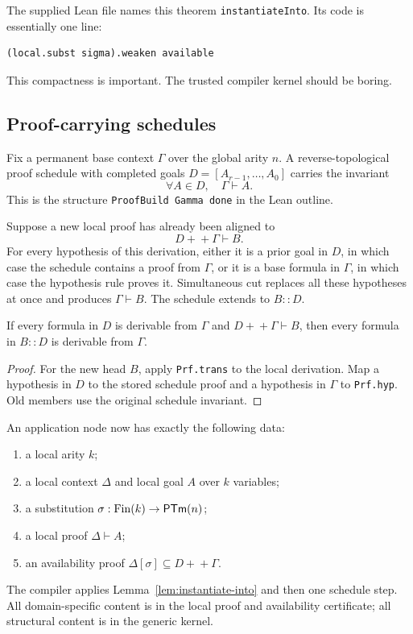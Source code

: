 The supplied Lean file names this theorem \texttt{instantiateInto}.  Its code is essentially one line:
\begin{lstlisting}[language={}]
(local.subst sigma).weaken available
\end{lstlisting}
This compactness is important.  The trusted compiler kernel should be boring.

\subsection{Proof-carrying schedules}

Fix a permanent base context \(\Gamma\) over the global arity \(n\).  A reverse-topological proof schedule
with completed goals \(D=[A_{r-1},\ldots,A_0]\) carries the invariant
\[
  \forall A\in D,\quad \Gamma\vdash A.
\]
This is the structure \texttt{ProofBuild Gamma done} in the Lean outline.

Suppose a new local proof has already been aligned to
\[
  D+\!+\Gamma\vdash B.
\]
For every hypothesis of this derivation, either it is a prior goal in \(D\), in which case the schedule
contains a proof from \(\Gamma\), or it is a base formula in \(\Gamma\), in which case the hypothesis rule
proves it.  Simultaneous cut replaces all these hypotheses at once and produces \(\Gamma\vdash B\).
The schedule extends to \(B::D\).

\begin{lemma}
If every formula in \(D\) is derivable from \(\Gamma\) and
\(D+\!+\Gamma\vdash B\), then every formula in \(B::D\) is derivable from \(\Gamma\).
\end{lemma}
\begin{proof}
For the new head \(B\), apply \texttt{Prf.trans} to the local derivation.  Map a hypothesis in \(D\) to the
stored schedule proof and a hypothesis in \(\Gamma\) to \texttt{Prf.hyp}.  Old members use the original
schedule invariant.
\end{proof}

An application node now has exactly the following data:
\begin{enumerate}
  \item a local arity \(k\);
  \item a local context \(\Delta\) and local goal \(A\) over \(k\) variables;
  \item a substitution \(\sigma:\mathrm{Fin}(k)\to\mathsf{PTm}(n)\);
  \item a local proof \(\Delta\vdash A\);
  \item an availability proof \(\Delta[\sigma]\subseteq D+\!+\Gamma\).
\end{enumerate}
The compiler applies Lemma~\ref{lem:instantiate-into} and then one schedule step.  All domain-specific
content is in the local proof and availability certificate; all structural content is in the generic
kernel.

